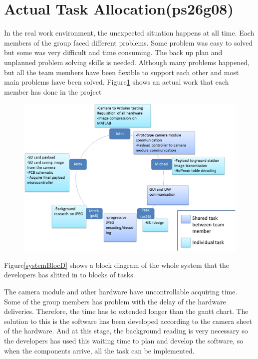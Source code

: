 \section{Actual Task Allocation(ps26g08)}
In the real work environment, the unexpected situation happens at all time. 
Each members of the group faced different problems.
Some problem was easy to solved but some was very difficult and time consuming. 
The back up plan and unplanned problem solving skills is needed. 
Although many problems happened, but all the team members have been flexible to support each other and most main problems have been solved. Figure\ref{final task allocation} shows an actual work that each member has done in the project

\begin{figure}[H]
        \centering
\includegraphics[width=1.0\textwidth]{figures/finalWorkAllocation.png} 
        \label{final task allocation}
\end{figure}

Figure\ref{systemBlocD} shows a block diagram of the whole system that the developers has slitted in to blocks of tasks. 

The camera module and other hardware have uncontrollable acquiring time. 
Some of the group members has problem with the delay of the hardware deliveries. Therefore, the time has to extended longer than the gantt chart. 
The solution to this is the software has been developed according to the camera sheet of the hardware. 
And at this stage, the background reading is very necessary so the developers has used this waiting time to plan and develop the software, so when the components arrive, all the task can be implemented.

